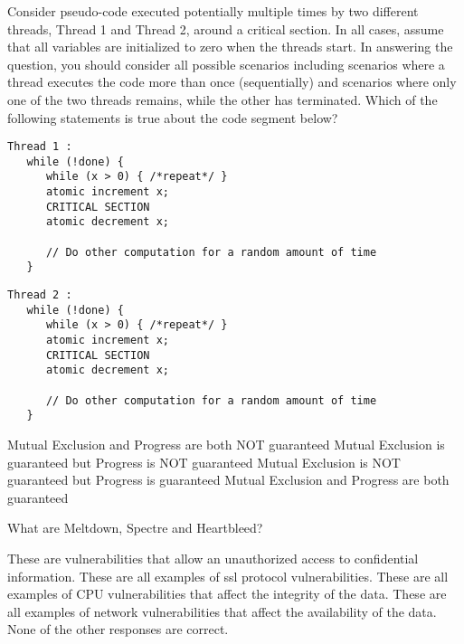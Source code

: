 \variant
Consider pseudo-code executed potentially multiple times by two different threads, Thread 1 and Thread 2, around a critical section.  In all cases, assume that all variables are initialized to zero when the threads start. In answering the question, you should consider all possible scenarios including scenarios where a thread executes the code more than once (sequentially) and scenarios where only one of the two threads remains, while the other has terminated. Which of the following statements is true about the code segment below?
\begin{verbatim}
Thread 1 :
   while (!done) {
      while (x > 0) { /*repeat*/ }
      atomic increment x;
      CRITICAL SECTION
      atomic decrement x;
      
      // Do other computation for a random amount of time
   }
\end{verbatim}

\begin{verbatim}
Thread 2 :
   while (!done) {
      while (x > 0) { /*repeat*/ }
      atomic increment x;
      CRITICAL SECTION
      atomic decrement x;
      
      // Do other computation for a random amount of time
   }
\end{verbatim}

\begin{answers}
\answer Mutual Exclusion and Progress are both NOT guaranteed
\answer Mutual Exclusion is guaranteed but Progress is NOT guaranteed
\correctanswer Mutual Exclusion is NOT guaranteed but Progress is guaranteed
\answer Mutual Exclusion and Progress are both guaranteed
\end{answers}
\begin{solution}
\end{solution}



\variant
What are Meltdown, Spectre and Heartbleed?

\begin{answers}
\correctanswer These are vulnerabilities that allow an unauthorized access to confidential information.
\answer These are all examples of ssl protocol vulnerabilities.
\answer These are all examples of CPU vulnerabilities that affect the integrity of the data.
\answer These are all examples of network vulnerabilities  that affect the availability of the data.
\answer None of the other responses are correct.
\end{answers}
\begin{solution}
\end{solution}


